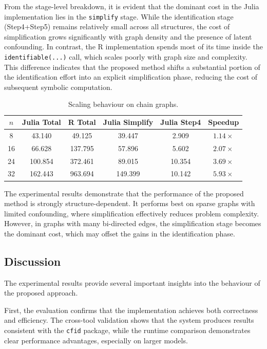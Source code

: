 \documentclass[a4paper]{report}
\begin{document}
From the stage-level breakdown, it is evident that the dominant cost in the Julia implementation lies in the \texttt{simplify} stage. While the identification stage (Step4+Step5) remains relatively small across all structures, the cost of simplification grows significantly with graph density and the presence of latent confounding. In contrast, the R implementation spends most of its time inside the \texttt{identifiable(...)} call, which scales poorly with graph size and complexity. This difference indicates that the proposed method shifts a substantial portion of the identification effort into an explicit simplification phase, reducing the cost of subsequent symbolic computation.

\begin{table}[h]
\centering
\begin{tabular}{cccccc}
\hline
$n$ & Julia Total & R Total & Julia Simplify & Julia Step4 & Speedup \\
\hline
8  & 43.140  & 49.125  & 39.447  & 2.909  & $1.14\times$ \\
16 & 66.628  & 137.795 & 57.896  & 5.602  & $2.07\times$ \\
24 & 100.854 & 372.461 & 89.015  & 10.354 & $3.69\times$ \\
32 & 162.443 & 963.694 & 149.399 & 10.142 & $5.93\times$ \\
\hline
\end{tabular}
\caption{Scaling behaviour on chain graphs.}
\label{tab:scaling_chain}
\end{table}

The experimental results demonstrate that the performance of the proposed method is strongly structure-dependent. It performs best on sparse graphs with limited confounding, where simplification effectively reduces problem complexity. However, in graphs with many bi-directed edges, the simplification stage becomes the dominant cost, which may offset the gains in the identification phase.


\subsection{Discussion}
The experimental results provide several important insights into the behaviour of the proposed approach.

First, the evaluation confirms that the implementation achieves both correctness and efficiency. The cross-tool validation shows that the system produces results consistent with the \texttt{cfid} package, while the runtime comparison demonstrates clear performance advantages, especially on larger models.
\end{document}
